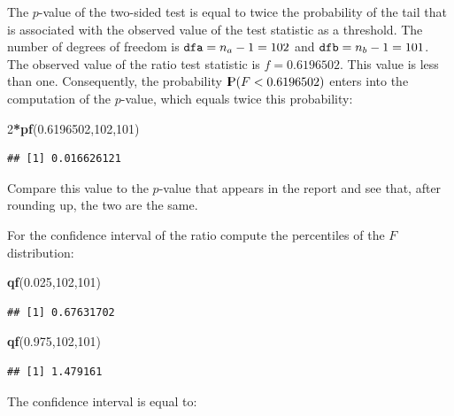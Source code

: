 \documentclass[]{krantz}
\makeatletter
\newenvironment{Shaded}{\begin{snugshade}}{\end{snugshade}}
\newcommand{\KeywordTok}[1]{\textcolor[rgb]{0.13,0.29,0.53}{\textbf{#1}}}
\newcommand{\DecValTok}[1]{\textcolor[rgb]{0.00,0.00,0.81}{#1}}
\newcommand{\FloatTok}[1]{\textcolor[rgb]{0.00,0.00,0.81}{#1}}
\newcommand{\OperatorTok}[1]{\textcolor[rgb]{0.81,0.36,0.00}{\textbf{#1}}}
\newcommand{\NormalTok}[1]{#1}
\newcommand{\Prob}{{\rm I\kern-.3em P}}
\newenvironment{kframe}{%
\medskip{}
\setlength{\fboxsep}{.8em}
 \def\at@end@of@kframe{}%
 \ifinner\ifhmode%
  \def\at@end@of@kframe{\end{minipage}}%
  \begin{minipage}{\columnwidth}%
 \fi\fi%
 \def\FrameCommand##1{\hskip\@totalleftmargin \hskip-\fboxsep
 \colorbox{shadecolor}{##1}\hskip-\fboxsep
     \hskip-\linewidth \hskip-\@totalleftmargin \hskip\columnwidth}%
 \MakeFramed {\advance\hsize-\width
   \@totalleftmargin\z@ \linewidth\hsize
   \@setminipage}}%
 {\par\unskip\endMakeFramed%
 \at@end@of@kframe}
\renewenvironment{Shaded}{\begin{kframe}}{\end{kframe}}
\theoremstyle{definition}
\theoremstyle{definition}
\theoremstyle{definition}
\theoremstyle{remark}
\makeatother
\begin{document}
The \(p\)-value of the two-sided test is equal to twice the probability
of the tail that is associated with the observed value of the test
statistic as a threshold. The number of degrees of freedom is
\(\mbox{\texttt{dfa}} = n_a - 1 = 102\) and
\(\mbox{\texttt{dfb}} = n_b - 1 = 101\). The observed value of the ratio
test statistic is \(f = 0.6196502\). This value is less than one.
Consequently, the probability \(\Prob(F < 0.6196502)\) enters into the
computation of the \(p\)-value, which equals twice this probability:

\begin{Shaded}
\begin{Highlighting}[]
\DecValTok{2}\OperatorTok{*}\KeywordTok{pf}\NormalTok{(}\FloatTok{0.6196502}\NormalTok{,}\DecValTok{102}\NormalTok{,}\DecValTok{101}\NormalTok{)}
\end{Highlighting}
\end{Shaded}

\begin{verbatim}
## [1] 0.016626121
\end{verbatim}

Compare this value to the \(p\)-value that appears in the report and see
that, after rounding up, the two are the same.

For the confidence interval of the ratio compute the percentiles of the
\(F\) distribution:

\begin{Shaded}
\begin{Highlighting}[]
\KeywordTok{qf}\NormalTok{(}\FloatTok{0.025}\NormalTok{,}\DecValTok{102}\NormalTok{,}\DecValTok{101}\NormalTok{)}
\end{Highlighting}
\end{Shaded}

\begin{verbatim}
## [1] 0.67631702
\end{verbatim}

\begin{Shaded}
\begin{Highlighting}[]
\KeywordTok{qf}\NormalTok{(}\FloatTok{0.975}\NormalTok{,}\DecValTok{102}\NormalTok{,}\DecValTok{101}\NormalTok{)}
\end{Highlighting}
\end{Shaded}

\begin{verbatim}
## [1] 1.479161
\end{verbatim}

The confidence interval is equal to:
\end{document}

